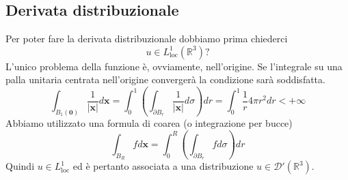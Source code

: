 \documentclass[10pt,a4paper,twoside,openright]{book}
\newcommand{\x}{\mathbf{x}}
\newcommand{\zer}{\mathbf{0}}
\begin{document}
\subsection{Derivata distribuzionale}

Per poter fare la derivata distribuzionale dobbiamo prima chiederci
\begin{equation*}
	u\in L^{1}_{\text{loc}}\left(\mathbb{R}^{3}\right) ?
\end{equation*}
L'unico problema della funzione è, ovviamente, nell'origine. Se l'integrale su una palla unitaria centrata nell'origine convergerà la condizione sarà soddisfatta.
\begin{equation*}
	\int _{B_{1}(\zer)}\frac{1}{| \x| } d\x =\int ^{1}_{0}\left(\int _{\partial B_{r}}\frac{1}{| \x| } d\sigma \right) dr=\int ^{1}_{0}\frac{1}{r} 4\pi r^{2} dr< +\infty 
\end{equation*}
Abbiamo utilizzato una formula di coarea (o integrazione per bucce) 
\begin{equation*}
	\int _{B_{R}} fd\x =\int ^{R}_{0}\left(\int _{\partial B_{r}} fd\sigma \right) dr
\end{equation*}
Quindi $\displaystyle u\in L_{\text{loc}}^{1}$ ed è pertanto associata a una distribuzione $\displaystyle u\in \mathcal{D} '\left(\mathbb{R}^{3}\right)$.
\end{document}
